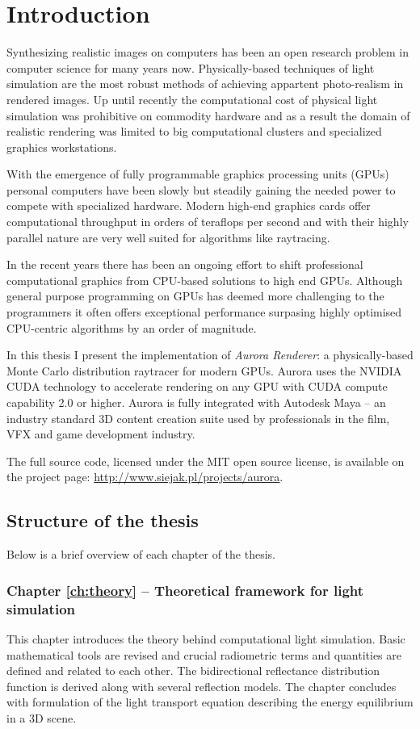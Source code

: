 \chapter{Introduction}
Synthesizing realistic images on computers has been an open research problem in computer science for many years now. Physically-based techniques of light simulation are the most robust methods of achieving appartent photo-realism in rendered images. Up until recently the computational cost of physical light simulation was prohibitive on commodity hardware and as a result the domain of realistic rendering was limited to big computational clusters and specialized graphics workstations.

With the emergence of fully programmable graphics processing units (GPUs) personal computers have been slowly but steadily gaining the needed power to compete with specialized hardware. Modern high-end graphics cards offer computational throughput in orders of teraflops per second and with their highly parallel nature are very well suited for algorithms like raytracing.

In the recent years there has been an ongoing effort to shift professional computational graphics from CPU-based solutions to high end GPUs. Although general purpose programming on GPUs has deemed more challenging to the programmers it often offers exceptional performance surpasing highly optimised CPU-centric algorithms by an order of magnitude.

In this thesis I present the implementation of \emph{Aurora Renderer}: a physically-based Monte Carlo distribution raytracer for modern GPUs. Aurora uses the NVIDIA CUDA technology to accelerate rendering on any GPU with CUDA compute capability 2.0 or higher. Aurora is fully integrated with Autodesk Maya -- an industry standard 3D content creation suite used by professionals in the film, VFX and game development industry.

The full source code, licensed under the MIT open source license, is available on the project page: \url{http://www.siejak.pl/projects/aurora}.
\vfill

\section{Structure of the thesis}
Below is a brief overview of each chapter of the thesis.

\subsection{Chapter \ref{ch:theory} -- Theoretical framework for light simulation}
This chapter introduces the theory behind computational light simulation. Basic mathematical tools are revised and crucial radiometric terms and quantities are defined and related to each other. The bidirectional reflectance distribution function is derived along with several reflection models. The chapter concludes with formulation of the light transport equation describing the energy equilibrium in a 3D scene.

